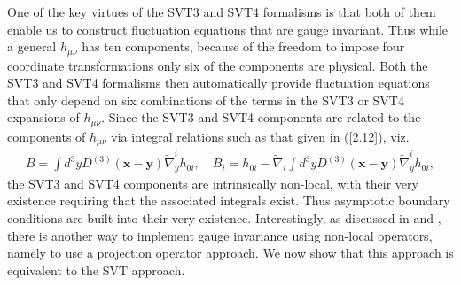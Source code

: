 \documentclass[aps,onecolumn,10pt]{revtex4}
\numberwithin{equation}{section}
\numberwithin{equation}{section}
\begin{document}
One of the key virtues of the  SVT3 and SVT4 formalisms is that both of them enable us to construct fluctuation equations that are gauge invariant. Thus  while a general $h_{\mu\nu}$ has ten components, because of the freedom to impose four coordinate transformations only six of the components are physical. Both the SVT3 and SVT4 formalisms then automatically provide fluctuation equations that only depend on six combinations of the terms in the SVT3 or SVT4 expansions of $h_{\mu\nu}$. Since the SVT3 and SVT4 components are related to the components of $h_{\mu\nu}$ via integral relations such as that given in (\ref{2.12}), viz. 
%
 \begin{eqnarray}
B=\int d^3yD^{(3)}(\mathbf{x}-\mathbf{y})\tilde{\nabla}_y^ih_{0i},\quad B_i=h_{0i}-\tilde{\nabla}_i\int d^3yD^{(3)}(\mathbf{x}-\mathbf{y})\tilde{\nabla}_y^ih_{0i},
\label{A.1a}
\end{eqnarray}
%
the SVT3 and SVT4 components are intrinsically non-local, with their very existence requiring that the associated integrals exist. Thus asymptotic boundary conditions are built into their very existence. Interestingly, as discussed in \cite{Mannheim2005} and \cite{Amarasinghe2018},  there is another way to implement gauge invariance using non-local operators, namely to use a projection operator approach.   We now show that this approach is equivalent to the SVT approach.
\end{document}
